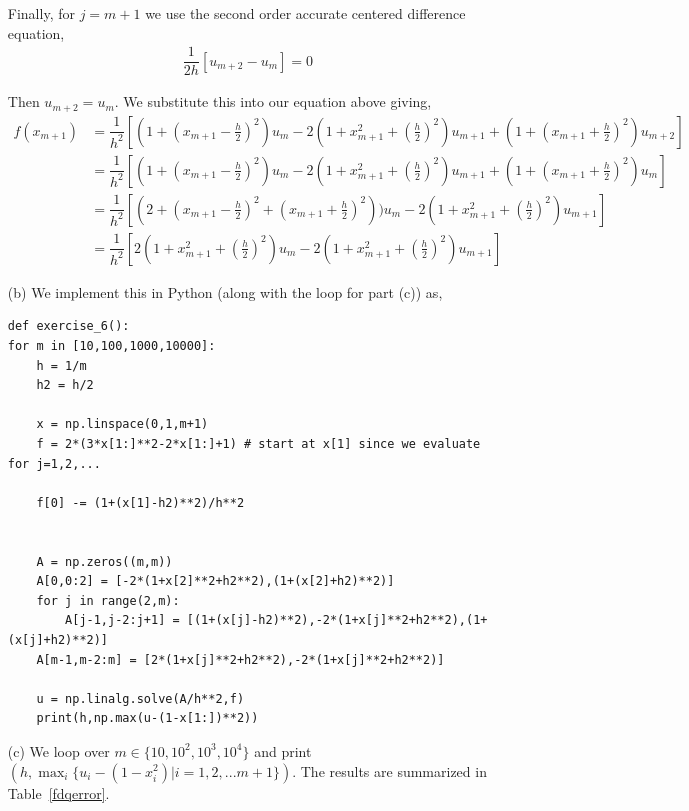 \documentclass[10pt]{article}
\begin{document}
\begin{solution}
\begin{enumerate}
        Finally, for \( j=m+1 \) we use the second order accurate centered difference equation,
        \begin{align*}
            \dfrac{1}{2h}[u_{m+2} - u_{m}] = 0
        \end{align*}
        
        Then \( u_{m+2} = u_{m} \). We substitute this into our equation above giving,
        \begin{align*}
            f(x_{m+1}) &= \dfrac{1}{h^2}[(1+(x_{m+1}-\tfrac{h}{2})^2)u_{m} - 2(1+x_{m+1}^2+(\tfrac{h}{2})^2)u_{m+1} + (1+(x_{m+1}+\tfrac{h}{2})^2)u_{m+2}    ] \\ 
            &= \dfrac{1}{h^2}[(1+(x_{m+1}-\tfrac{h}{2})^2)u_{m} - 2(1+x_{m+1}^2+(\tfrac{h}{2})^2)u_{m+1} + (1+(x_{m+1}+\tfrac{h}{2})^2)u_{m}    ] \\ 
            &= \dfrac{1}{h^2}[(2+(x_{m+1}-\tfrac{h}{2})^2 + (x_{m+1}+\tfrac{h}{2})^2))u_{m} - 2(1+x_{m+1}^2+(\tfrac{h}{2})^2)u_{m+1}   ] \\
            &= \dfrac{1}{h^2}[2(1+x_{m+1}^2+(\tfrac{h}{2})^2)u_{m} - 2(1+x_{m+1}^2+(\tfrac{h}{2})^2)u_{m+1}   ]
        \end{align*}


   \item[(b)] We implement this in Python (along with the loop for part (c)) as,
        \begin{lstlisting}
def exercise_6():
for m in [10,100,1000,10000]:
    h = 1/m
    h2 = h/2

    x = np.linspace(0,1,m+1)
    f = 2*(3*x[1:]**2-2*x[1:]+1) # start at x[1] since we evaluate for j=1,2,...

    f[0] -= (1+(x[1]-h2)**2)/h**2


    A = np.zeros((m,m))
    A[0,0:2] = [-2*(1+x[2]**2+h2**2),(1+(x[2]+h2)**2)]
    for j in range(2,m):
        A[j-1,j-2:j+1] = [(1+(x[j]-h2)**2),-2*(1+x[j]**2+h2**2),(1+(x[j]+h2)**2)]
    A[m-1,m-2:m] = [2*(1+x[j]**2+h2**2),-2*(1+x[j]**2+h2**2)]

    u = np.linalg.solve(A/h**2,f)
    print(h,np.max(u-(1-x[1:])**2))
        \end{lstlisting}

    \item[(c)]
        We loop over \( m\in\{10,10^2,10^3,10^4\} \) and print \( (h,\max_i\{u_i-(1-x_i^2)| i=1,2,...m+1\}) \). The results are summarized in Table~\ref{fdqerror}.


\end{enumerate}
\end{solution}
\end{document}
